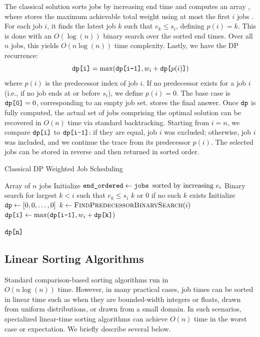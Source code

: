 \documentclass[final,5p,times]{elsarticle}
\makeatletter
\newcommand{\code}[1]{\texttt{\detokenize{#1}}}
\newcommand{\breaktwo}{\if@twocolumn\\\fi}
\makeatother
\begin{document}
The classical solution sorts jobs by increasing end time and computes an array \code{dp}, where \code{dp[i]} stores the maximum achievable total weight using at most the first $i$ jobs \cite{kleinberg2005}. For each job $i$, it finds the latest job $k$ such that $e_k \leq s_i$, defining $p(i) = k$. This is done with an $O(\log(n))$ binary search over the sorted end times. Over all $n$ jobs, this yields $O(n \log(n))$ time complexity. Lastly, we have the DP recurrence:
\[
\code{dp[i]} = \max(\code{dp[i-1]}, w_i + \code{dp[}p(i)\code{]})
\]
where $p(i)$ is the predecessor index of job $i$. If no predecessor exists for a job $i$ (i.e., if no job ends at or before $s_i$), we define $p(i) = 0$. The base case is $\code{dp[0]}=0$, corresponding to an empty job set. \code{dp[n]} stores the final answer. Once $\code{dp}$ is fully computed, the actual set of jobs comprising the optimal solution can be recovered in $O(n)$ time via standard backtracking. Starting from $i = n$, we compare $\code{dp[i]}$ to $\code{dp[i-1]}$: if they are equal, job $i$ was excluded; otherwise, job $i$ was included, and we continue the trace from its predecessor $p(i)$. The selected jobs can be stored in reverse and then returned in sorted order.

\begin{algorithm}[H]
\caption{Classical DP Weighted Job Scheduling}
\begin{algorithmic}[1]
\Require Array \code{jobs} of $n$ jobs
\State Initialize $\code{end_ordered} \gets \code{jobs } \text{sorted by increasing } e_i$
    \State Binary search for largest $k < i$ such that $e_k \leq s_i$
    \State \Return $k$ or $0$ if no such $k$ exists
\EndFunction
\State Initialize $\code{dp} \gets [0, 0, \ldots, 0]$
    \State $k \gets \textsc{FindPredecessorBinarySearch}(i)$
    \State $\code{dp[i]} \gets \max(\code{dp[i-1]}, w_i + \code{dp[k]})$
\EndFor

\State \Return $\code{dp[n]}$
\end{algorithmic}
\end{algorithm}


\subsection{Linear Sorting Algorithms}
\label{sec:sorting}
Standard comparison-based sorting algorithms run in \breaktwo$O(n \log(n))$ time. However, in many practical cases, job times can be sorted in linear time such as when they are bounded-width integers or floats, drawn from uniform distributions, or drawn from a small domain. In such scenarios, specialized linear-time sorting algorithms can achieve $O(n)$ time in the worst case or expectation. We briefly describe several below.
\end{document}
